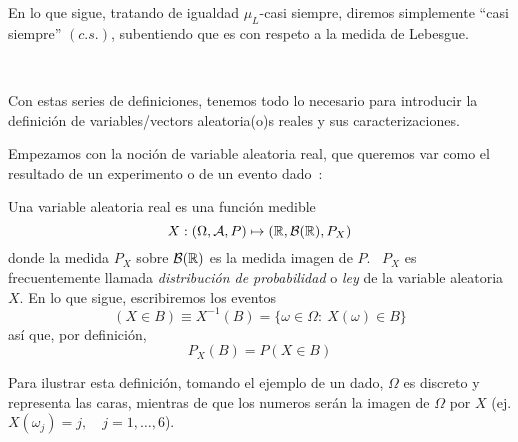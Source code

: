 En lo que sigue, tratando  de igualdad $\mu_L$-casi siempre, diremos simplemente
``casi  siempre''  $(c.s.)$, subentiendo  que  es con  respeto  a  la medida  de
Lebesgue.

\

Con  estas  series de definiciones,  tenemos  todo   lo  necesario  para   introducir  la
definici\'on de variables/vectors aleatoria(o)s reales y sus caracterizaciones.



\label{sec:MP:VAGeneral}

Empezamos con la  noci\'on de variable aleatoria real, que  queremos var como el
resultado de un experimento o de un evento dado~\cite{AthLah06, Coh13, Bre88}:
%
\begin{definicion}
  Una variable aleatoria real es una funci\'on medible
  \[
  X: (\Omega,\mathcal{A},P) \mapsto (\mathbb{R},\mathcal{B}(\mathbb{R}),P_X)
  \]
  donde la medida  $P_X$ sobre $\mathcal{B}(\mathbb{R})$ es la medida imagen  de $P$.  \ $P_X$
  es frecuentemente llamada {\it distribuci\'on  de probabilidad} o {\it ley} de
  la variable aleatoria $X$. En lo que sigue, escribiremos los eventos
  \[
  (X \in B) \equiv X^{-1}(B) = \{ \omega \in \Omega: \: X(\omega) \in B \}
  \]
  as\'i que, por definici\'on,
  \[
  P_X(B) = P(X \in B)
  \]
\end{definicion}
%
Para  ilustrar esta definici\'on,  tomando el  ejemplo de  un dado,  $\Omega$ es
discreto y representa  las caras, mientras de que los  numeros ser\'an la imagen
de $\Omega$ por $X$ (ej. $X(\omega_j) = j, \quad j = 1, \ldots , 6$).


